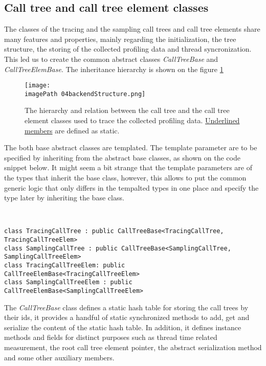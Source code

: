 \subsection{Call tree and call tree element classes}
The classes of the tracing and the sampling call trees and call tree elements share many features and properties, mainly regarding the initialization, the tree structure, the storing of the collected profiling data and thread syncronization. This led us to create the common abstract classes \textit{CallTreeBase} and \textit{CallTreeElemBase}. The inheritance hierarchy is shown on the figure \ref{fig:04backendStructure}


\begin{figure}
	\centering
		\texttt{[image: \\imagePath 04backendStructure.png]}
		\caption{The hierarchy and relation between the call tree and the call tree element classes used to trace the collected profiling data. \underline{Underlined members} are defined as static.}
	\label{fig:04backendStructure}
\end{figure}

The both base abstract classes are templated. The template parameter are to be specified by inheriting from the abstract base classes, as shown on the code snippet below. It might seem a bit strange that the template parameters are of the types that inherit the base class, however, this allows to put the common generic logic that only differs in the tempalted types in one place and specify the type later by inheriting the base class.

\ 

\begin{lstlisting} 
class TracingCallTree : public CallTreeBase<TracingCallTree, TracingCallTreeElem>
class SamplingCallTree : public CallTreeBase<SamplingCallTree, SamplingCallTreeElem>
class TracingCallTreeElem: public CallTreeElemBase<TracingCallTreeElem>
class SamplingCallTreeElem : public CallTreeElemBase<SamplingCallTreeElem>
\end{lstlisting}

The \textit{CallTreeBase} class defines a static hash table for storing the call trees by their ids, it provides a handful of static synchronized methods to add, get and serialize the content of the static hash table. In addition, it defines instance methods and fields for distinct purposes such as thread time related measurement, the root call tree element pointer, the abstract serialization method and some other auxiliary members.

